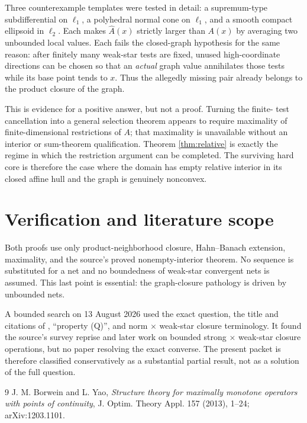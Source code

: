 \documentclass[11pt]{article}
\begin{document}
Three counterexample templates were tested in detail: a supremum-type
subdifferential on $\ell_1$, a polyhedral normal cone on $\ell_1$, and a
smooth compact ellipsoid in $\ell_2$.  Each makes $\widehat A(x)$ strictly
larger than $A(x)$ by averaging two unbounded local values.  Each fails the
closed-graph hypothesis for the same reason: after finitely many weak-star
tests are fixed, unused high-coordinate directions can be chosen so that an
\emph{actual} graph value annihilates those tests while its base point tends
to $x$.  Thus the allegedly missing pair already belongs to the product
closure of the graph.

This is evidence for a positive answer, but not a proof.  Turning the finite-
test cancellation into a general selection theorem appears to require
maximality of finite-dimensional restrictions of $A$; that maximality is
unavailable without an interior or sum-theorem qualification.  Theorem
\ref{thm:relative} is exactly the regime in which the restriction argument
can be completed.  The surviving hard core is therefore the case where the
domain has empty relative interior in its closed affine hull and the graph is
genuinely nonconvex.

\section{Verification and literature scope}

Both proofs use only product-neighborhood closure, Hahn--Banach extension,
maximality, and the source's proved nonempty-interior theorem.  No sequence is
substituted for a net and no boundedness of weak-star convergent nets is
assumed.  This last point is essential: the graph-closure pathology is driven
by unbounded nets.

A bounded search on 13 August 2026 used the exact question, the title and
citations of \cite{BY}, ``property (Q)'', and norm $\times$ weak-star closure
terminology.  It found the source's survey reprise and later work on bounded
strong $\times$ weak-star closure operations, but no paper resolving the
exact converse.  The present packet is therefore classified conservatively
as a substantial partial result, not as a solution of the full question.

\begin{thebibliography}{9}
J. M. Borwein and L. Yao,
\emph{Structure theory for maximally monotone operators with points of
continuity}, J. Optim. Theory Appl. 157 (2013), 1--24;
arXiv:1203.1101.
\end{thebibliography}
\end{document}
